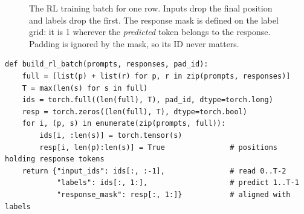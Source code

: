 \begin{figure}[t]
\centering
{}
\caption{The RL training batch for one row. Inputs drop the final position and labels drop the
first. The response mask is defined on the label grid: it is 1 wherever the \emph{predicted}
token belongs to the response. Padding is ignored by the mask, so its ID never matters.}
\label{fig:pg:layout}
\end{figure}

\begin{lstlisting}[caption={Building the RL batch from token-ID lists (\code{llmsys.pg.build\_rl\_batch}).},label={lst:pg:batch}]
def build_rl_batch(prompts, responses, pad_id):
    full = [list(p) + list(r) for p, r in zip(prompts, responses)]
    T = max(len(s) for s in full)
    ids = torch.full((len(full), T), pad_id, dtype=torch.long)
    resp = torch.zeros((len(full), T), dtype=torch.bool)
    for i, (p, s) in enumerate(zip(prompts, full)):
        ids[i, :len(s)] = torch.tensor(s)
        resp[i, len(p):len(s)] = True               # positions holding response tokens
    return {"input_ids": ids[:, :-1],               # read 0..T-2
            "labels": ids[:, 1:],                   # predict 1..T-1
            "response_mask": resp[:, 1:]}           # aligned with labels
\end{lstlisting}

